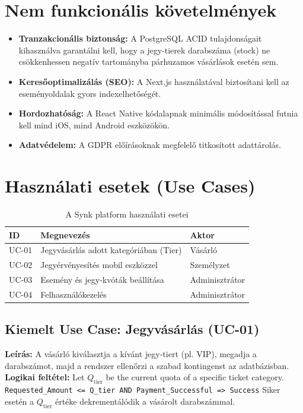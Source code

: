 \documentclass[colorlinks]{docs}
\theoremstyle{definition}
\theoremstyle{remark}
\begin{document}
\section{Nem funkcionális követelmények}
\begin{itemize}
    \item \textbf{Tranzakcionális biztonság:} A PostgreSQL ACID tulajdonságait kihasználva garantálni kell, hogy a jegy-tierek darabszáma (stock) ne csökkenhessen negatív tartományba párhuzamos vásárlások esetén sem.
    \item \textbf{Keresőoptimalizálás (SEO):} A Next.js használatával biztosítani kell az eseményoldalak gyors indexelhetőségét.
    \item \textbf{Hordozhatóság:} A React Native kódalapnak minimális módosítással futnia kell mind iOS, mind Android eszközökön.
    \item \textbf{Adatvédelem:} A GDPR előírásoknak megfelelő titkosított adattárolás.
\end{itemize}

\section{Használati esetek (Use Cases)}



\begin{table}[ht]
    \centering
    \begin{tabular}{|l|p{6cm}|l|}
        \hline
        \textbf{ID} & \textbf{Megnevezés} & \textbf{Aktor} \\ \hline
        UC-01 & Jegyvásárlás adott kategóriában (Tier) & Vásárló \\ \hline
        UC-02 & Jegyérvényesítés mobil eszközzel & Személyzet \\ \hline
        UC-03 & Esemény és jegy-kvóták beállítása & Adminisztrátor \\ \hline
        UC-04 & Felhasználókezelés & Adminisztrátor \\ \hline
    \end{tabular}
    \caption{A Synk platform használati esetei}
    \label{tab:use_cases_tier}
\end{table}

\subsection{Kiemelt Use Case: Jegyvásárlás (UC-01)}
\textbf{Leírás:} A vásárló kiválasztja a kívánt jegy-tiert (pl. VIP), megadja a darabszámot, majd a rendszer ellenőrzi a szabad kontingenst az adatbázisban.
\textbf{Logikai feltétel:}
Let $Q_{\text{tier}}$ be the current quota of a specific ticket category.
\texttt{Requested\_Amount <= Q\_tier \quad AND \quad Payment\_Successful => Success}
Siker esetén a $Q_{\text{tier}}$ értéke dekrementálódik a vásárolt darabszámmal.
\end{document}

